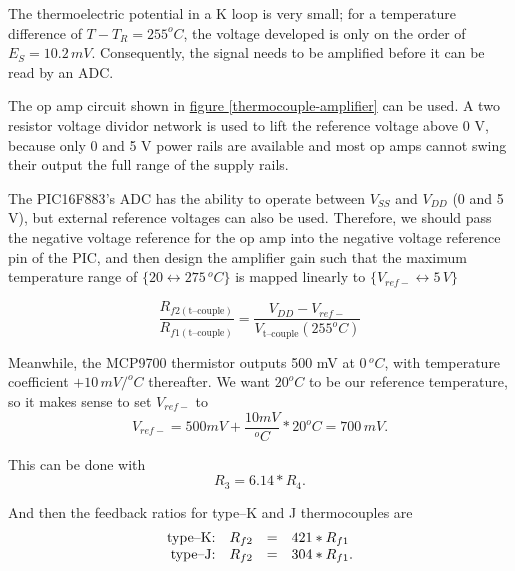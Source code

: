 \documentclass[10pt, twocolumn]{article}
\begin{document}
The thermoelectric potential in a K loop is very small; 
for a temperature difference of $T-T_{R}=255^{o}C$,
the voltage developed is only on the order of $E_{S}=10.2\,mV$.
Consequently, the signal needs to be amplified before it can be read by an ADC.

The op amp circuit shown in
\hyperref[thermocouple-amplifier]{figure \ref{thermocouple-amplifier}}
can be used. A two resistor voltage dividor network is used to lift the reference
voltage above 0 V, because only 0 and 5 V power rails are available and most
op amps cannot swing their output the full range of the supply rails.

The \textrm{PIC16F883}'s ADC has the ability to operate between $V_{SS}$ and $V_{DD}$ (0 and 5 V),
but external reference voltages can also be used. Therefore, we should pass the
negative voltage reference for the op amp into the negative voltage reference pin of the PIC,
and then design the amplifier gain such that the maximum temperature range of $\{20\leftrightarrow275\,^{o}C\}$
is mapped linearly to $\{V_{ref-}\leftrightarrow5\,V\}$

\begin{equation}
	\frac{R_{f2(\textrm{t--couple})}}{R_{f1(\textrm{t--couple})}}=
	\frac{V_{DD}-V_{ref-}}{V_{\textrm{t--couple}}(255^{o}C)}
	\label{feedback-resistors-eq}
\end{equation}

Meanwhile, the MCP9700 thermistor outputs 500 mV at $0\,^{o}C$,
with temperature coefficient $+10\,mV/^{o}C$ thereafter.
We want $20^{o}C$ to be our reference temperature, so it makes sense to
set $V_{ref-}$ to
\begin{equation*}
V_{ref-}=500mV+\frac{10mV}{^{o}C}*20^{o}C=700\,mV.
\end{equation*}

This can be done with
\begin{equation}
R_{3}=6.14*R_{4}.
\label{vref-resistors-eq}
\end{equation}

And then the feedback ratios for type--K and J thermocouples are
\begin{equation}
\begin{array}{r c c l}
\textrm{type--K:}	&R_{f2}	&=&	421*R_{f1}	\\
\textrm{type--J:}	&R_{f2}	&=&	304*R_{f1}.	\\
\end{array}
\label{thermocouple-feedback-ratios-eq}
\end{equation}
\end{document}
